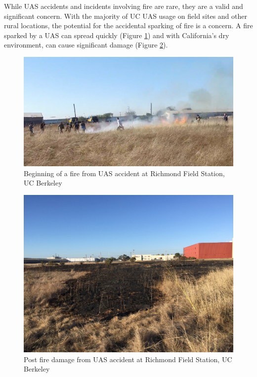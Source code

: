 \documentclass[
]{book}
\begin{document}
While UAS accidents and incidents involving fire are rare, they are a valid and significant concern. With the majority of UC UAS usage on field sites and other rural locations, the potential for the accidental sparking of fire is a concern. A fire sparked by a UAS can spread quickly (Figure \ref{fig:fire-start}) and with California's dry environment, can cause significant damage (Figure \ref{fig:fire-damage}).

\begin{figure}

{\centering \includegraphics[width=0.75\linewidth]{images/fire_start} 

}

\caption{Beginning of a fire from UAS accident at Richmond Field Station, UC Berkeley}\label{fig:fire-start}
\end{figure}

\begin{figure}

{\centering \includegraphics[width=0.75\linewidth]{images/fire_damage} 

}

\caption{Post fire damage from UAS accident at Richmond Field Station, UC Berkeley}\label{fig:fire-damage}
\end{figure}
\end{document}
